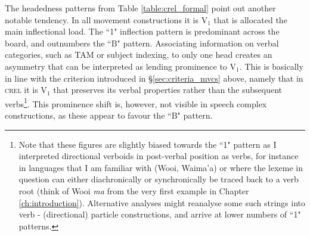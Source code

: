 The headedness patterns from Table \ref{table:crel_formal} point out another notable tendency. In all movement constructions it is V$_1$ that is allocated the main inflectional load. The ``1" inflection pattern is predominant across the board, and outnumbers the ``B" pattern. Associating information on verbal categories, such as TAM or subject indexing, to only one head creates an asymmetry that can be interpreted as lending prominence to V$_1$. This is basically in line with the criterion introduced in §\ref{sec:criteria_mvcs} above, namely that in \textsc{crel} it is V$_1$ that preserves its verbal properties rather than the subsequent verbs\footnote{Note that these figures are slightly biased towards the ``1" pattern as I interpreted directional verboids in post-verbal position as verbs, for instance in languages that I am familiar with (Wooi, Waima'a) or where the lexeme in question can either diachronically or synchronically be traced back to a verb root (think of Wooi \textit{ma} from the very first example in Chapter \ref{ch:introduction}). Alternative analyses might reanalyse some such strings into verb - (directional) particle constructions, and arrive at lower numbers of ``1" patterns.}. This prominence shift is, however, not visible in speech complex constructions, as these appear to favour the ``B" pattern.

